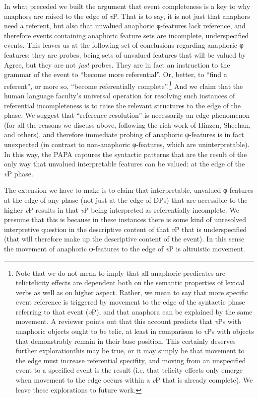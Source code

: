 \documentclass[output=paper
,modfonts
,nonflat
]{langsci/langscibook}
\begin{document}
In what preceded we built the argument that event completeness is a key to why anaphors are raised to the edge of \textit{v}P. That is to say, it is not just that anaphors need a referent, but also that unvalued anaphoric φ-features lack reference, and therefore events containing anaphoric feature sets are incomplete, underspecified events. This leaves us at the following set of conclusions regarding anaphoric φ-features: they are probes, being sets of unvalued features that will be valued by Agree, but they are not \textit{just} probes. They are in fact an instruction to the grammar of the event to ``become more referential''. Or, better, to ``find a referent'', or more so, ``become referentially complete''.\footnote{Note that we do not mean to imply that all anaphoric predicates are telic\textemdash telicity effects are dependent both on the semantic properties of lexical verbs as well as on higher aspect. Rather, we mean to say that more specific event reference is triggered by movement to the edge of the syntactic phase referring to that event (\textit{v}P), and that anaphora can be explained by the same movement. A reviewer points out that this account predicts that \textit{v}Ps with anaphoric objects ought to be telic, at least in comparison to \textit{v}Ps with objects that demonstrably remain in their base position. This certainly deserves further exploration\textemdash this may be true, or it may simply be that movement to the edge must increase referential specifity, and moving from an unspecified event to a specified event is the result (i.e. that telicity effects only emerge when movement to the edge occurs within a \textit{v}P that is already complete). We leave these explorations to future work.} And we claim that the human language faculty's universal operation for resolving such instances of referential incompleteness is to raise the relevant structures to the edge of the phase. We suggest that ``reference resolution'' is necessarily an edge phenomenon (for all the reasons we discuss above, following the rich work of Hinzen, Sheehan, and others), and therefore immediate probing of anaphoric φ-features is in fact unexpected (in contrast to non-anaphoric φ-features, which are uninterpretable). In this way, the PAPA captures the syntactic patterns that are the result of the only way that unvalued interpretable features can be valued: at the edge of the \textit{v}P phase.

The extension we have to make is to claim that interpretable, unvalued φ-features at the edge of any phase (not just at the edge of DPs) that are accessible to the higher \textit{v}P results in that \textit{v}P being interpreted as referentially incomplete. We presume that this is because in these instances there is some kind of unresolved interpretive question in the descriptive content of that \textit{v}P that is underspecified (that will therefore make up the descriptive content of the event). In this sense the movement of anaphoric φ-features to the edge of \textit{v}P is altruistic movement. 
\end{document}
